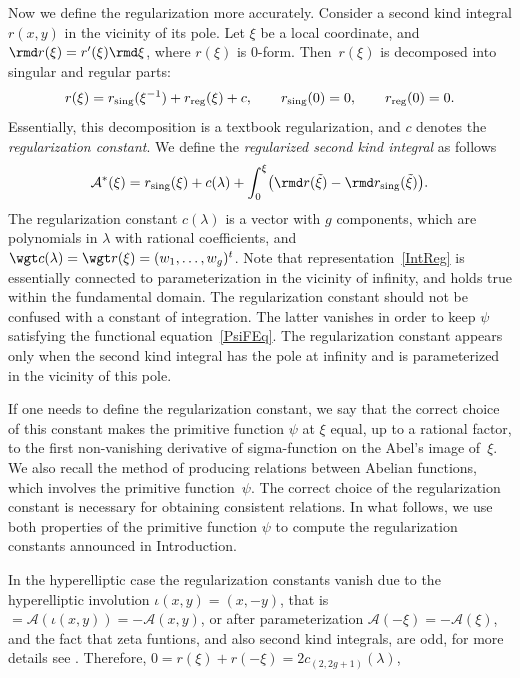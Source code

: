 Now we define the regularization more accurately. Consider a second kind integral $r(x,y)$ in the vicinity of its pole. Let $\xi$ be a local coordinate, and $\rmd r(\xi)=r'(\xi)\rmd \xi$, where $r(\xi)$ is $0$-form. Then~$r(\xi)$ is decomposed into singular and regular parts:
\begin{gather*}%
 r(\xi) = r_{\textup{sing}}(\xi^{-1}) + r_{\textup{reg}}(\xi) + c,\qquad r_{\textup{sing}}(0)=0,\qquad r_{\textup{reg}}(0)=0.
\end{gather*}
Essentially, this decomposition is a textbook regularization, and $c$ denotes the \emph{regularization constant}. We define the \emph{regularized second kind integral} as follows
\begin{gather}\label{IntReg}
 \mathcal{A}^\ast(\xi)= r_{\textup{sing}} (\xi)
+ c(\lambda) + \int_0^{\xi} \bigl(\rmd r(\tilde{\xi})- \rmd r_{\textup{sing}} (\tilde{\xi}) \bigr).
\end{gather}
The regularization constant $c(\lambda)$ {is a vector with $g$ components, which are} polynomials in $\lambda$ with rational coefficients, and $\wgt c(\lambda) = \wgt r(\xi) = (w_1,\dots,w_g)^t$. Note that representation~\eqref{IntReg} is essentially connected to parameterization in the vicinity of infinity, and holds true within the fundamental domain. The regularization constant should not be confused with a constant of integration. The latter vanishes in order to keep $\psi$ satisfying the functional equation~\eqref{PsiFEq}. The regularization constant appears only when the second kind integral has the pole at infinity and is parameterized in the vicinity of this pole.

If one needs to define the regularization constant, we say that the correct choice of this constant makes the primitive function $\psi$ at $\xi$ equal, up to a rational factor, to the first non-vanishing derivative of sigma-function on the Abel's image of~$\xi$. We also recall {the method} of producing relations between Abelian functions, which involves the primitive function~$\psi$. The correct choice of the regularization constant is necessary for obtaining consistent relations. In what follows, we use both properties of the primitive function $\psi$ to compute the regularization constants announced in Introduction.

In the hyperelliptic case the regularization constants vanish due to the hyperelliptic involution $\iota(x,y) = (x,-y)$, that is $ = \mathcal{A}(\iota(x,y)) = -\mathcal{A}(x,y)$, or after parameterization $\mathcal{A}(-\xi) = -\mathcal{A}(\xi)$, and the fact that zeta funtions, and also second kind integrals, are odd, for more details see \cite[Section~193]{BakerAF}. Therefore, $0=r(\xi)+r(-\xi)=2c_{(2,2g+1)}(\lambda)$,

